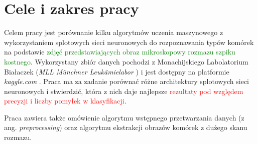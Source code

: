 \section{Cele i zakres pracy}

Celem pracy jest porównanie kilku algorytmów uczenia maszynowego z wykorzystaniem splotowych sieci neuronowych do rozpoznawania typów komórek na podstawie \textcolor{green}{zdjęć przedstawiających obraz mikroskopowy rozmazu szpiku kostnego}.
Wykorzystany zbiór danych pochodzi z
Monachijskiego Labolatorium Białaczek (\textit{MLL Münchner Leukämielabor} \cite{mll}) i jest dostępny na platformie \textit{kaggle.com} \cite{dataset}.
Praca ma za zadanie porównać różne architektury splotowych sieci neuronowych i stwierdzić, która z nich daje najlepsze \textcolor{red}{rezultaty pod względem precyzji i liczby pomyłek w klasyfikacji}.

Praca zawiera także omówienie algorytmu wstępnego przetwarzania danych (z ang. \textit{preprocessing}) oraz algorytmu ekstrakcji obrazów komórek z dużego skanu rozmazu.
